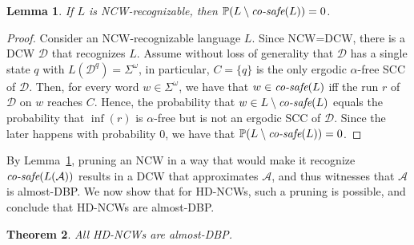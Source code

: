 \documentclass[10pt,a4paper]{amsart}
\newtheorem{thm}{Theorem}[section]
\newtheorem{lem}[thm]{Lemma}
\theoremstyle{definition}
\numberwithin{equation}{section}
\newcommand{\A}{{\mathcal A}}
\newcommand{\D}{{\mathcal D}}
\renewcommand{\P}{\mathbb{P}}
\newcommand{\cs}{\mbox{\it co-safe}}
\begin{document}
\begin{lem}\label{good prefix is 1-apprx of NCW}	If $L$ is NCW-recognizable, then $\P(L\setminus \cs(L))=0$.
\end{lem}

\begin{proof}
Consider an NCW-recognizable language $L$. Since NCW=DCW, there is a DCW $\D$ that recognizes $L$. Assume without loss of generality that $\D$ has a single state $q$ with $L(\D^q) = \Sigma^\omega$, in particular, $C = \{q\}$ is the only ergodic $\alpha$-free SCC of $\D$. Then, for every word $w \in \Sigma^\omega$, we have that $w \in \cs(L)$ iff the run $r$ of $\D$ on $w$ reaches $C$. Hence, the probability that $w \in L\setminus \cs(L)$ equals the probability that $\inf(r)$ is $\alpha$-free but is not an ergodic SCC of $\D$. Since the later happens with probability 0, we have that  $\P(L\setminus \cs(L))=0$.
\end{proof}

By Lemma~\ref{good prefix is 1-apprx of NCW}, pruning an NCW in a way that would make it recognize $\cs(L(\A))$ results in a DCW that approximates $\A$, and thus witnesses that $\A$ is almost-DBP. We now show that for HD-NCWs, such a pruning is possible, and conclude that HD-NCWs are almost-DBP. 

\begin{thm}\label{HD-ncw almost}All HD-NCWs are almost-DBP.\end{thm}
\end{document}
